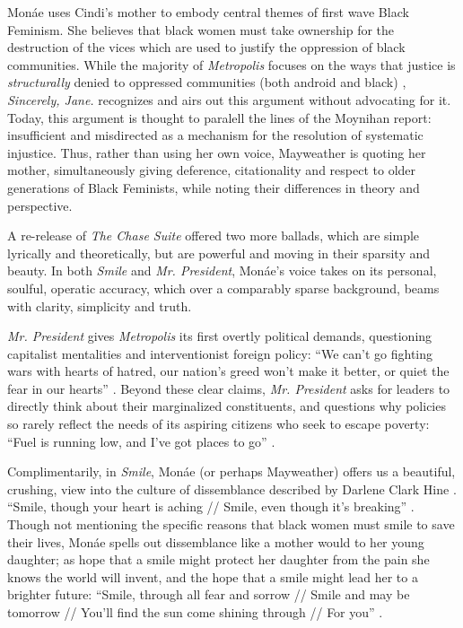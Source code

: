 \documentclass[a4paper, 11pt]{article} %
\begin{document}
Mon\'ae uses Cindi's mother to embody central themes of first wave Black Feminism.
She believes that black women must take ownership for the destruction of the vices which are used to justify the oppression of black communities. 
While the majority of \emph{Metropolis} focuses on the ways that justice is \emph{structurally} denied to oppressed communities (both android and black) \cite{queen}, \emph{Sincerely, Jane.} recognizes and airs out this argument without advocating for it.
Today, this argument is thought to paralell the lines of the Moynihan report: insufficient and misdirected as a mechanism for the resolution of systematic injustice. 
Thus, rather than using her own voice, Mayweather is quoting her mother, simultaneously giving deference, citationality and respect to older generations of Black Feminists, while noting their differences in theory and perspective.

A re-release of \emph{The Chase Suite} offered two more ballads, which are simple lyrically and theoretically, but are powerful and moving in their sparsity and beauty.
In both \emph{Smile} and \emph{Mr. President}, Mon\'ae's voice takes on its personal, soulful, operatic accuracy, which over a comparably sparse background, beams with clarity, simplicity and truth.

\emph{Mr. President} gives \emph{Metropolis} its first overtly political demands, questioning capitalist mentalities and interventionist foreign policy: 
``We can't go fighting wars with hearts of hatred, our nation's greed won't make it better, or quiet the fear in our hearts'' \cite{mrpresident}.
Beyond these clear claims, \emph{Mr. President} asks for leaders to directly think about their marginalized constituents, and questions why policies so rarely reflect the needs of its aspiring citizens who seek to escape poverty:
``Fuel is running low, and I've got places to go'' \cite{mrpresident}.

Complimentarily, in \emph{Smile}, Mon\'ae (or perhaps Mayweather) offers us a beautiful, crushing, view into the culture of dissemblance described by Darlene Clark Hine \cite{hine}.
``Smile, though your heart is aching // Smile, even though it's breaking'' \cite{smile}.
Though not mentioning the specific reasons that black women must smile to save their lives, Mon\'ae spells out dissemblance like a mother would to her young daughter; as hope that a smile might protect her daughter from the pain she knows the world will invent, and the hope that a smile might lead her to a brighter future:
``Smile, through all fear and sorrow // Smile and may be tomorrow // You'll find the sun come shining through // For you'' \cite{smile}.
\end{document}
